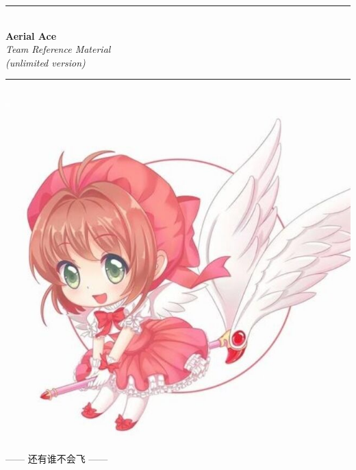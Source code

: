\documentclass[titlepage, openany]{book}
\begin{document}
    \begin{titlepage}
        \centering
        \rule{\linewidth}{0.5mm}\\[0.4cm]
        {\Huge\bfseries Aerial Ace}\\[\baselineskip]
        {\textit {\Large Team Reference Material}}\\
        {\textit {\small (unlimited version)}}\\[0.4cm]
        \rule{\linewidth}{0.5mm}\\[2cm]
        \vfill
        \includegraphics[scale=0.4]{pictures/Groudon.jpg}\\[0.4cm]
        {\large ------ 还有谁不会飞 ------}
        \vfill
        \\[0.1cm]
        \\[0.1cm]
        \\[0.4cm]

\end{titlepage}
\end{document}
